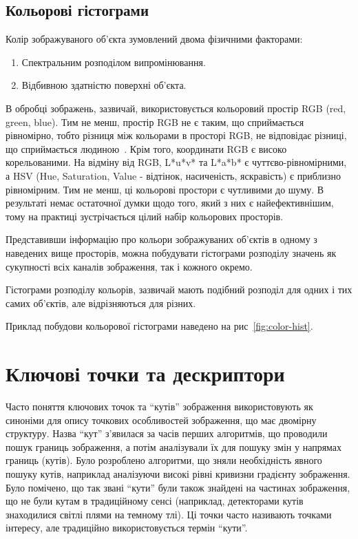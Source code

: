 \subsection{Кольорові гістограми}

Колір зображуваного об'єкта зумовлений двома фізичними факторами:

\begin{enumerate}
  \item Спектральним розподілом випромінювання.
  \item Відбивною здатністю поверхні об'єкта.
\end{enumerate}

В обробці зображень, зазвичай, використовується кольоровий простір RGB (red, green, blue). Тим не менш, простір RGB не є таким, що сприймається рівномірно, тобто різниця між кольорами в просторі RGB, не відповідає різниці, що сприймається людиною~\cite{Paschos2001}. Крім того, координати RGB є високо корельованими. На відміну від RGB, L*u*v* та L*a*b* є чуттєво-рівномірними, а HSV (Hue, Saturation, Value - відтінок, насиченість, яскравість) є приблизно рівномірним. Тим не менш, ці кольорові простори є чутливими до шуму. В результаті немає остаточної думки щодо того, який з них є найефективнішим, тому на практиці зустрічається цілий набір кольорових просторів.

Представивши інформацію про кольори зображуваних об'єктів в одному з наведених вище просторів, можна побудувати гістограми розподілу значень як сукупності всіх каналів зображення, так і кожного окремо. 

Гістограми розподілу кольорів, зазвичай мають подібний розподіл для одних і тих самих об'єктів, але відрізняються для різних.

Приклад побудови кольорової гістограми наведено на рис~\ref{fig:color-hist}.


\section{Ключові точки та дескриптори}

Часто поняття ключових точок та ``кутів'' зображення використовують як синоніми для опису точкових особливостей зображення, що має двомірну структуру. Назва ``кут'' з'явилася за часів перших алгоритмів, що проводили пошук границь зображення, а потім аналізували їх для пошуку змін у напрямах границь (кутів). Було розроблено алгоритми, що зняли необхідність явного пошуку кутів, наприклад аналізуючи високі рівні кривизни градієнту зображення. Було помічено, що так звані ``кути'' були також знайдені на частинах зображення, що не були кутам в традиційному сенсі (наприклад, детекторами кутів знаходилися світлі плями на темному тлі). Ці точки часто називають точками інтересу, але традиційно використовується термін ``кути''.

